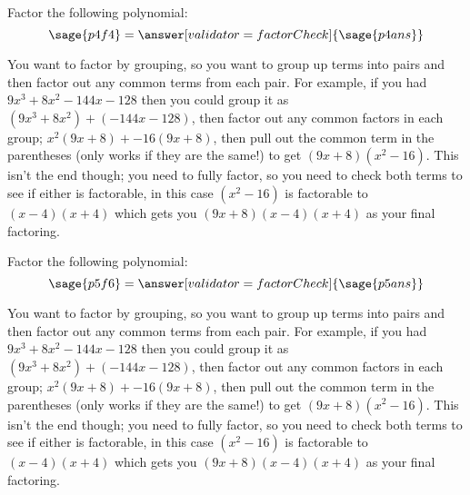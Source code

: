 \documentclass{ximera}
\begin{document}
\begin{problem}
    Factor the following polynomial:
    \[
        \sage{p4f4} = \answer[validator=factorCheck]{\sage{p4ans}}
    \]
    \begin{feedback}
        You want to factor by grouping, so you want to group up terms into pairs and then factor out any common terms from each pair. For example, if you had $9x^3 + 8x^2 - 144x - 128$ then you could group it as $(9x^3+8x^2) + (-144x -128)$, then factor out any common factors in each group; $x^2(9x+8) + -16(9x+8)$, then pull out the common term in the parentheses (only works if they are the same!) to get $(9x+8)(x^2-16)$. This isn't the end though; you need to fully factor, so you need to check both terms to see if either is factorable, in this case $(x^2-16)$ is factorable to $(x-4)(x+4)$ which gets you $(9x+8)(x-4)(x+4)$ as your final factoring.
    \end{feedback}
\end{problem}

\begin{problem}
    Factor the following polynomial:
    \[
        \sage{p5f6} = \answer[validator=factorCheck]{\sage{p5ans}}
    \]
    \begin{feedback}
        You want to factor by grouping, so you want to group up terms into pairs and then factor out any common terms from each pair. For example, if you had $9x^3 + 8x^2 - 144x - 128$ then you could group it as $(9x^3+8x^2) + (-144x -128)$, then factor out any common factors in each group; $x^2(9x+8) + -16(9x+8)$, then pull out the common term in the parentheses (only works if they are the same!) to get $(9x+8)(x^2-16)$. This isn't the end though; you need to fully factor, so you need to check both terms to see if either is factorable, in this case $(x^2-16)$ is factorable to $(x-4)(x+4)$ which gets you $(9x+8)(x-4)(x+4)$ as your final factoring.
    \end{feedback}
\end{problem}
\end{document}
